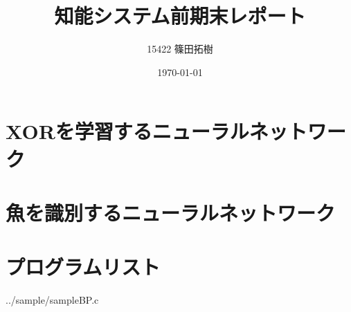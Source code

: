 \documentclass {jsarticle}
\begin{document}
\title{知能システム前期末レポート}
\author{15422 篠田拓樹}
\date{\today}
\maketitle
\newpage
\section{XORを学習するニューラルネットワーク}
  
\section{魚を識別するニューラルネットワーク}
  
\newpage
\section{プログラムリスト}
\begin{multicols}{2}

{../sample/sampleBP.c}
\end{multicols}
\end{document}
